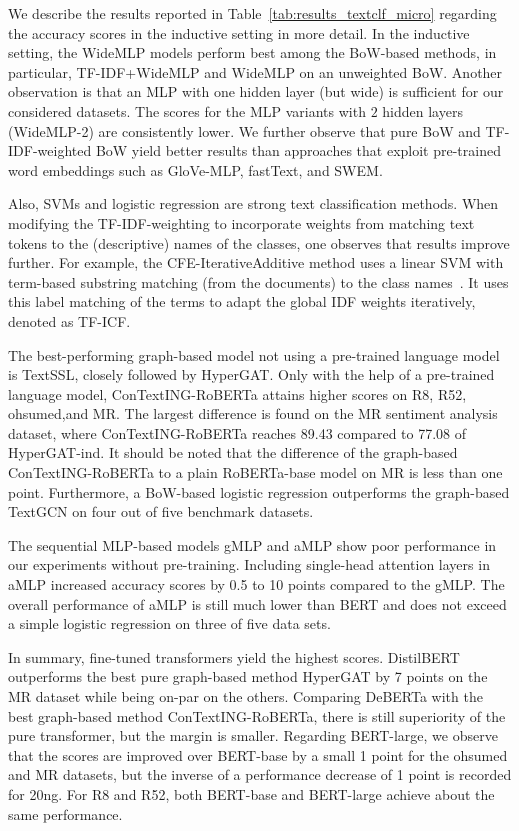 We describe the results reported in Table~\ref{tab:results_textclf_micro} regarding the accuracy scores in the inductive setting in more detail. 
In the inductive setting, the WideMLP models perform best among the BoW-based methods, in particular, TF-IDF+WideMLP and WideMLP on an unweighted BoW.
Another observation is that an MLP with one hidden layer (but wide) is sufficient for our considered datasets.
The scores for the MLP variants with $2$ hidden layers (WideMLP-2) are consistently lower.
We further observe that pure BoW and TF-IDF-weighted BoW yield better results than approaches that exploit pre-trained word embeddings such as GloVe-MLP, fastText, and SWEM.

Also, SVMs and logistic regression are strong text classification methods.
When modifying the TF-IDF-weighting to incorporate weights from matching text tokens to the (descriptive) names of the classes, one observes that results improve further.
For example, the CFE-IterativeAdditive method uses a linear SVM with term-based substring matching (from the documents) to the class names~\cite{ATTIEH2023110215}.
It uses this label matching of the terms to adapt the global IDF weights iteratively, denoted as TF-ICF.

The best-performing graph-based model not using a pre-trained language model is TextSSL, closely followed by HyperGAT.
Only with the help of a pre-trained language model, ConTextING-RoBERTa attains higher scores on R8, R52, ohsumed,and  MR.
The largest difference is found on the MR sentiment analysis dataset, where ConTextING-RoBERTa reaches 89.43 compared to 77.08 of HyperGAT-ind.
It should be noted that the difference of the graph-based ConTextING-RoBERTa to a plain RoBERTa-base model on MR is less than one point.
Furthermore, a BoW-based logistic regression outperforms the graph-based TextGCN on four out of five benchmark datasets.

The sequential MLP-based models gMLP and aMLP show poor performance in our experiments without pre-training. Including single-head attention layers in aMLP increased accuracy scores by 0.5 to 10 points compared to the gMLP.
The overall performance of aMLP is still much lower than BERT and does not exceed a simple logistic regression on three of five data sets.

In summary, fine-tuned transformers yield the highest scores.
DistilBERT outperforms the best pure graph-based method HyperGAT by 7 points on the MR dataset while being on-par on the others.
Comparing DeBERTa with the best graph-based method ConTextING-RoBERTa, there is still superiority of the pure transformer, but the margin is smaller.
Regarding BERT-large, we observe that the scores are improved over BERT-base by a small 1 point for the ohsumed and MR datasets, but the inverse of a performance decrease of 1 point is recorded for 20ng. 
For R8 and R52, both BERT-base and BERT-large achieve about the same performance. 

